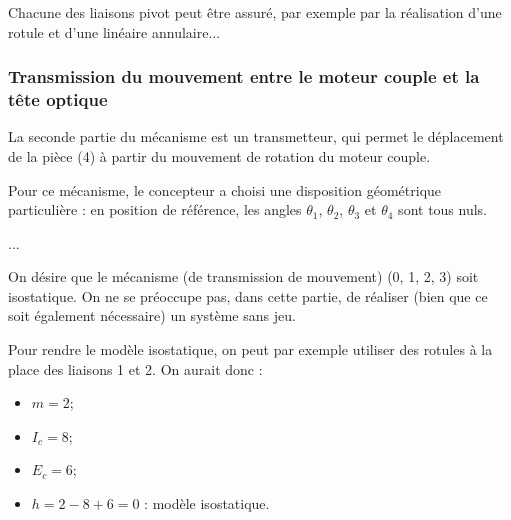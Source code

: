 \ifprof
\begin{corrige}
Chacune des liaisons pivot peut être assuré, par exemple par la réalisation d'une rotule et d'une linéaire annulaire...

\end{corrige}
\else
\fi

\subsubsection{Transmission du mouvement entre le moteur couple et la tête optique}
\ifprof
\else
La seconde partie du mécanisme est un transmetteur, qui permet le déplacement de la pièce (4) à partir du
mouvement de rotation du moteur couple.

Pour ce mécanisme, le concepteur a choisi une disposition géométrique particulière : en position de
référence, les angles $\theta_1$, $\theta_2$, $\theta_3$ et $\theta_4$ sont tous nuls.
\fi

\ifprof
\begin{corrige}
...
\end{corrige}
\else
\fi

\ifprof
\else
On désire que le mécanisme (de transmission de mouvement) (0, 1, 2, 3) soit isostatique. On ne se
préoccupe pas, dans cette partie, de réaliser (bien que ce soit également nécessaire) un système sans jeu.
\fi

\ifprof
\begin{corrige}
Pour rendre le modèle isostatique, on peut par exemple utiliser des rotules à la place des liaisons 1 et 2. 
On aurait donc :
\begin{itemize}
\item $m=2$;
\item $I_c = 8$;
\item $E_c = 6$;
\item $h=2-8+6=0$ : modèle isostatique. 
\end{itemize}
\end{corrige}
\else
\fi